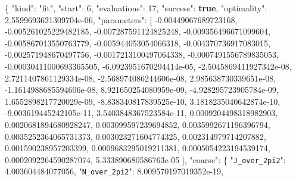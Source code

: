 \documentclass[
  10pt,
]{article}
\newenvironment{Shaded}{}{}
\newcommand{\DataTypeTok}[1]{\textcolor[rgb]{0.56,0.13,0.00}{#1}}
\newcommand{\DecValTok}[1]{\textcolor[rgb]{0.25,0.63,0.44}{#1}}
\newcommand{\FloatTok}[1]{\textcolor[rgb]{0.25,0.63,0.44}{#1}}
\newcommand{\FunctionTok}[1]{\textcolor[rgb]{0.02,0.16,0.49}{#1}}
\newcommand{\KeywordTok}[1]{\textcolor[rgb]{0.00,0.44,0.13}{\textbf{#1}}}
\newcommand{\OtherTok}[1]{\textcolor[rgb]{0.00,0.44,0.13}{#1}}
\newcommand{\StringTok}[1]{\textcolor[rgb]{0.25,0.44,0.63}{#1}}
\begin{document}
\begin{Shaded}
\begin{Highlighting}[]
\FunctionTok{\{}
  \DataTypeTok{"kind"}\FunctionTok{:} \StringTok{"fit"}\FunctionTok{,}
  \DataTypeTok{"start"}\FunctionTok{:} \DecValTok{6}\FunctionTok{,}
  \DataTypeTok{"evaluations"}\FunctionTok{:} \DecValTok{17}\FunctionTok{,}
  \DataTypeTok{"success"}\FunctionTok{:} \KeywordTok{true}\FunctionTok{,}
  \DataTypeTok{"optimality"}\FunctionTok{:} \FloatTok{2.5599693621309704e{-}06}\FunctionTok{,}
  \DataTypeTok{"parameters"}\FunctionTok{:} \OtherTok{[}
    \FloatTok{{-}0.00449067689723168}\OtherTok{,}
    \FloatTok{{-}0.005261025229482185}\OtherTok{,}
    \FloatTok{{-}0.007287591124825248}\OtherTok{,}
    \FloatTok{{-}0.009356496671099604}\OtherTok{,}
    \FloatTok{{-}0.005867013550763779}\OtherTok{,}
    \FloatTok{{-}0.005944053054066318}\OtherTok{,}
    \FloatTok{{-}0.004370736917083015}\OtherTok{,}
    \FloatTok{{-}0.002571948670497756}\OtherTok{,}
    \FloatTok{{-}0.0017213100497064338}\OtherTok{,}
    \FloatTok{{-}0.0007491556789835053}\OtherTok{,}
    \FloatTok{{-}0.00030411000693365505}\OtherTok{,}
    \FloatTok{{-}6.0923951670294414e{-}05}\OtherTok{,}
    \FloatTok{{-}2.5045869411927342e{-}08}\OtherTok{,}
    \FloatTok{2.7211407861129334e{-}08}\OtherTok{,}
    \FloatTok{{-}2.568974086244606e{-}08}\OtherTok{,}
    \FloatTok{2.985638730339651e{-}08}\OtherTok{,}
    \FloatTok{{-}1.1614988685594606e{-}08}\OtherTok{,}
    \FloatTok{8.921650254080959e{-}09}\OtherTok{,}
    \FloatTok{{-}4.928295723905784e{-}09}\OtherTok{,}
    \FloatTok{1.6552898217720029e{-}09}\OtherTok{,}
    \FloatTok{{-}8.838340817839525e{-}10}\OtherTok{,}
    \FloatTok{3.1818235040642874e{-}10}\OtherTok{,}
    \FloatTok{{-}9.003619445242105e{-}11}\OtherTok{,}
    \FloatTok{3.5403848367523584e{-}11}\OtherTok{,}
    \FloatTok{0.0009204498318982903}\OtherTok{,}
    \FloatTok{0.0020681894680928247}\OtherTok{,}
    \FloatTok{0.003099597239694852}\OtherTok{,}
    \FloatTok{0.0035992671196396794}\OtherTok{,}
    \FloatTok{0.0035252364065731373}\OtherTok{,}
    \FloatTok{0.003023271604774325}\OtherTok{,}
    \FloatTok{0.002314979714207882}\OtherTok{,}
    \FloatTok{0.001590238957203399}\OtherTok{,}
    \FloatTok{0.0009683295019211381}\OtherTok{,}
    \FloatTok{0.0005054223194539174}\OtherTok{,}
    \FloatTok{0.0002092264590287074}\OtherTok{,}
    \FloatTok{5.333890680586763e{-}05}
  \OtherTok{]}\FunctionTok{,}
  \DataTypeTok{"coarse"}\FunctionTok{:} \FunctionTok{\{}
    \DataTypeTok{"\nolinkurl{J_over_2pi2}"}\FunctionTok{:} \FloatTok{4.003604484077056}\FunctionTok{,}
    \DataTypeTok{"\nolinkurl{N_over_2pi2}"}\FunctionTok{:} \FloatTok{8.009570197019352e{-}19}\FunctionTok{,}

\end{Highlighting}
\end{Shaded}
\end{document}
